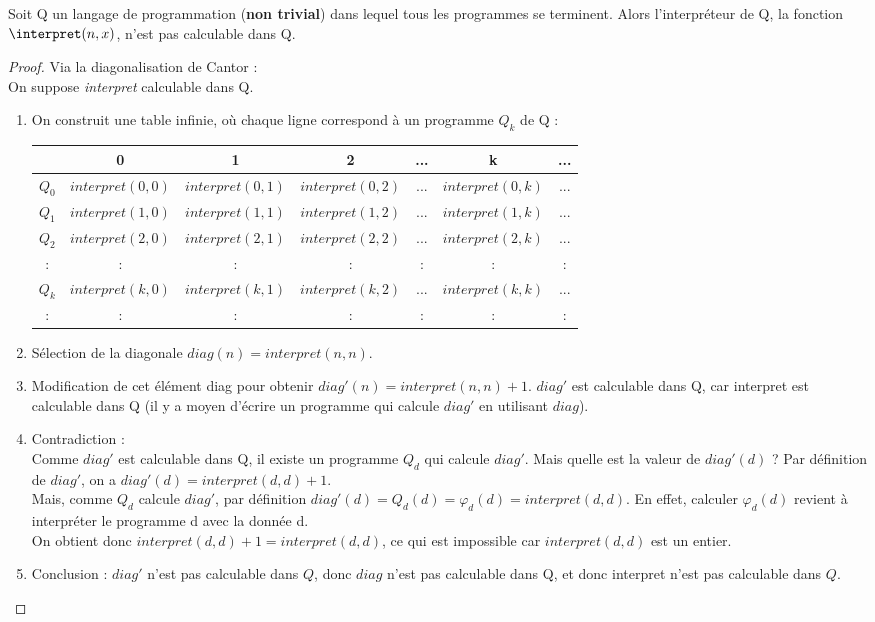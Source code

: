 \begin{mytheo}
	\label{Hoare_Allison}
Soit Q un langage de programmation (\textbf{non trivial}) dans lequel tous les programmes se terminent.	Alors l'interpréteur de Q, la fonction $\interpret(n,x)$, n'est pas calculable dans Q.
\end{mytheo}

\begin{proof} Via la diagonalisation de Cantor : \\
On suppose \textit{interpret} calculable dans Q.
\begin{enumerate}
	\item On construit une table infinie, où chaque ligne correspond à un programme $Q_k$ de Q : \\
		\begin{tabular}{|c||c|c|c|c|c|c|}
			\hline
			& 0 & 1 & 2 & ... & k & ... \\
			\hline
			$Q_0$ & $interpret(0,0)$ & $interpret(0,1)$ & $interpret(0,2)$ & ... & $interpret(0,k)$ & ... \\
			$Q_1$ & $interpret(1,0)$ & $interpret(1,1)$ & $interpret(1,2)$ & ... & $interpret(1,k)$ & ... \\
			$Q_2$ & $interpret(2,0)$ & $interpret(2,1)$ & $interpret(2,2)$ & ... & $interpret(2,k)$ & ... \\
			: & : &:& : & : & : &:\\
			$Q_k$ & $interpret(k,0)$ & $interpret(k,1)$ & $interpret(k,2)$ & ... & $interpret(k,k)$ & ... \\
			: & : &:& : & : & : &:\\
			\hline
		\end{tabular}
	\item Sélection de la diagonale
		$diag(n) = interpret(n,n)$.
	\item Modification de cet élément diag pour obtenir
		$diag'(n) = interpret(n,n)+1$.
		$diag'$ est calculable dans Q, car interpret est calculable dans Q (il y a moyen
		d'écrire un programme qui calcule $diag'$ en utilisant $diag$).

	\item Contradiction :\\
	       	Comme $diag'$ est calculable dans Q, il existe un programme $Q_d$ qui calcule $diag'$.
		Mais quelle est la valeur de $diag'(d)$ ?
		Par définition de $diag'$, on a $diag'(d) = interpret(d,d)+1$. \\
		Mais, comme $Q_d$ calcule $diag'$, par définition $diag'(d) = Q_d(d) = \varphi_d(d) = interpret(d,d)$.
		En effet, calculer $\varphi_d(d)$ revient à interpréter le programme
		d avec la donnée d. \\
		On obtient donc $interpret(d,d)+1 = interpret(d,d)$, ce qui est impossible car $interpret(d,d)$ est un entier.
	\item Conclusion : $diag'$ n'est pas calculable dans $Q$, donc $diag$
	n'est pas calculable dans Q, et donc interpret n'est pas calculable dans $Q$.

\end{enumerate}
\end{proof}

